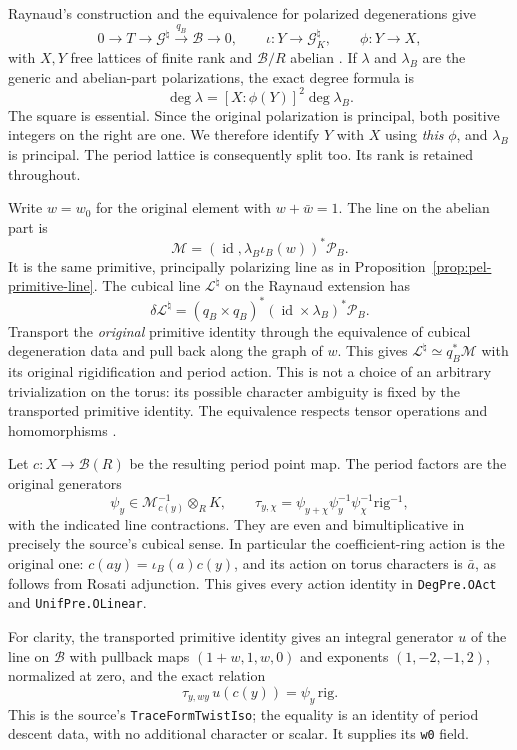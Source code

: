 Raynaud's construction and the equivalence for polarized degenerations
give
\[
 0\longrightarrow T\longrightarrow\mathcal G^\natural
   \xrightarrow{\,q_B\,}\mathcal B\longrightarrow0,
 \qquad \iota:Y\longrightarrow\mathcal G^\natural_K,
 \qquad \phi:Y\longrightarrow X,
\]
with $X,Y$ free lattices of finite rank and $\mathcal B/R$ abelian
\cite[Sections 3.3.3, 4.2.1 and Theorem 4.4.16]{dvr-unif-lan}.
If $\lambda$ and $\lambda_B$ are the generic and abelian-part
polarizations, the exact degree formula is
\[
       \deg\lambda=[X:\phi(Y)]^2\deg\lambda_B.
\]
The square is essential\cite[Lemma 3.4.4.3]{dvr-unif-lan}.
Since the original polarization is principal, both positive integers
on the right are one.  We therefore identify $Y$ with $X$ using
\emph{this} $\phi$, and $\lambda_B$ is principal.  The period lattice
is consequently split too.  Its rank is retained throughout.

Write $w=w_0$ for the original element with $w+\bar w=1$.
The line on the abelian part is
\[
  \mathscr M=(\operatorname{id},\lambda_B\iota_B(w))^*
                    \mathcal P_B.
\]
It is the same primitive, principally polarizing line as in
Proposition~\ref{prop:pel-primitive-line}.  The cubical line
$\mathscr L^\natural$ on the Raynaud extension has
\[
 \delta\mathscr L^\natural
   =(q_B\times q_B)^*(\operatorname{id}\times\lambda_B)^*\mathcal P_B.
\]
Transport the \emph{original} primitive identity through the
equivalence of cubical degeneration data and pull back along the
graph of $w$.  This gives
$\mathscr L^\natural\simeq q_B^*\mathscr M$ with its original
rigidification and period action.  This is not a choice of an
arbitrary trivialization on the torus: its possible character
ambiguity is fixed by the transported primitive identity.
The equivalence respects tensor operations and homomorphisms
\cite[Theorem 4.4.16 and Section 5.1.1]{dvr-unif-lan}.

Let $c:X\to\mathcal B(R)$ be the resulting period point map.
The period factors are the original generators
\[
 \psi_y\in\mathscr M_{c(y)}^{-1}\otimes_R K,
 \qquad
 \tau_{y,\chi}
   =\psi_{y+\chi}\psi_y^{-1}\psi_\chi^{-1}\mathrm{rig}^{-1},
\]
with the indicated line contractions.  They are even and bimultiplicative
in precisely the source's cubical sense.  In particular the
coefficient-ring action is the original one: $c(ay)=\iota_B(a)c(y)$,
and its action on torus characters is $\bar a$, as follows from
Rosati adjunction.  This gives every action identity in
\texttt{DegPre.OAct} and \texttt{UnifPre.OLinear}.

For clarity, the transported primitive identity gives an integral
generator $u$ of the line on $\mathcal B$ with pullback maps
$(1+w,1,w,0)$ and exponents $(1,-2,-1,2)$, normalized at zero, and
the exact relation
\[
       \tau_{y,wy}\,u(c(y))=\psi_y\,\mathrm{rig}.
\]
This is the source's \texttt{TraceFormTwistIso}; the equality is an
identity of period descent data, with no additional character or
scalar.  It supplies its \texttt{w0} field.

